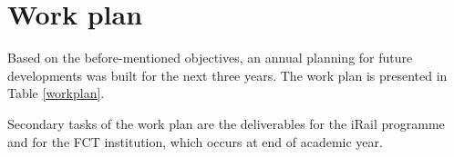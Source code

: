 	

\newpage
\section{Work plan}
\label{sec:44}

Based on the before-mentioned objectives, an annual planning for future developments was built for the next three years. 
The work plan is presented in Table \ref{workplan}. 


Secondary tasks of the work plan are the deliverables for the iRail programme and for the FCT institution, which occurs at end of academic year. 






